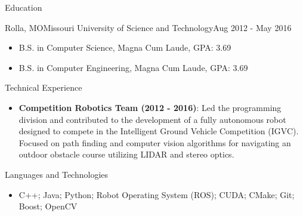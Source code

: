 \documentclass[]{mcdowellcv}
\begin{document}
\begin{cvsection}{Education}
    \begin{cvsubsection}[2]{Rolla, MO}{Missouri University of Science and Technology}{Aug 2012 - May 2016}
        \begin{itemize}
            \item B.S. in Computer Science, Magna Cum Laude, GPA: 3.69
            \item B.S. in Computer Engineering, Magna Cum Laude, GPA: 3.69
        \end{itemize}
    \end{cvsubsection}
\end{cvsection} 

\begin{cvsection}{Technical Experience}
    \begin{cvsubsection}{}{}{}  
        \begin{itemize} 
            \item \textbf{Competition Robotics Team (2012 - 2016)}: Led the programming division and contributed to the development of a fully autonomous robot designed to compete in the Intelligent Ground Vehicle Competition (IGVC). Focused on path finding and computer vision algorithms for navigating an outdoor obstacle course utilizing LIDAR and stereo optics.
        \end{itemize}
    \end{cvsubsection}
\end{cvsection}

\begin{cvsection}{Languages and Technologies}
    \begin{cvsubsection}{}{}{}  
        \begin{itemize}
            \item C++; Java; Python; Robot Operating System (ROS); CUDA; CMake; Git; Boost; OpenCV
        \end{itemize}
    \end{cvsubsection}
\end{cvsection}
\end{document}
